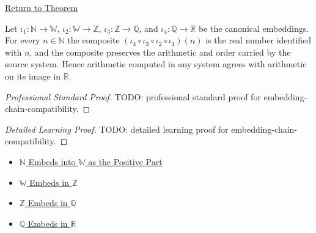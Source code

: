 \newpage
{}
\label{prf:embedding-chain-compatibility}

\begin{remark*}[Return]
\hyperref[thm:embedding-chain-compatibility]{Return to Theorem}
\end{remark*}

\begin{theorem*}
Let $\iota_{1}:\mathbb{N}\to\mathbb{W}$, $\iota_{2}:\mathbb{W}\to\mathbb{Z}$, $\iota_{3}:\mathbb{Z}\to\mathbb{Q}$, and $\iota_{4}:\mathbb{Q}\to\mathbb{R}$ be the canonical embeddings. For every $n\in\mathbb{N}$ the composite $(\iota_{4}\circ\iota_{3}\circ\iota_{2}\circ\iota_{1})(n)$ is the real number identified with $n$, and the composite preserves the arithmetic and order carried by the source system. Hence arithmetic computed in any system agrees with arithmetic on its image in $\mathbb{R}$.
\end{theorem*}

\begin{proof}[Professional Standard Proof]
\LRAProofBodyStart
TODO: professional standard proof for embedding-chain-compatibility.
\end{proof}

\begin{proof}[Detailed Learning Proof]
\LRAProofBodyStart
TODO: detailed learning proof for embedding-chain-compatibility.
\end{proof}

\begin{remark*}
\end{remark*}

\begin{dependencies}
\begin{itemize}
  \item \hyperref[thm:n-embeds-into-w-as-positive-part]{$\mathbb{N}$ Embeds into $\mathbb{W}$ as the Positive Part}
  \item \hyperref[thm:w-embeds-in-z]{$\mathbb{W}$ Embeds in $\mathbb{Z}$}
  \item \hyperref[thm:z-embeds-in-q]{$\mathbb{Z}$ Embeds in $\mathbb{Q}$}
  \item \hyperref[thm:q-embeds-in-r]{$\mathbb{Q}$ Embeds in $\mathbb{R}$}
\end{itemize}
\end{dependencies}

\clearpage
